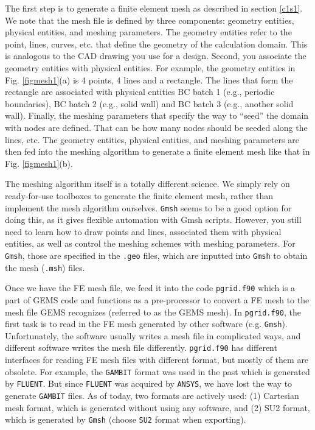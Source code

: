 \documentclass[12pt, letterpaper]{report}
\begin{document}
The first step is to generate a finite element mesh as described in section \ref{c1s1}. We note that
the mesh file is defined by three components: geometry entities, physical entities, and meshing
parameters. The geometry entities refer to the point, lines, curves, etc. that define the geometry
of the calculation domain. This is analogous to the CAD drawing you use for a design. Second, you
associate the geometry entities with physical entities. For example, the geometry entities in Fig.
\ref{figmesh1}(a) is 4 points, 4 lines and a rectangle. The lines that form the rectangle are
associated with physical entities BC batch 1 (e.g., periodic boundaries), BC batch 2 (e.g., solid
wall) and BC batch 3 (e.g., another solid wall). Finally, the meshing parameters that specify the
way to ``seed'' the domain with nodes are defined. That can be how many nodes should be seeded along
the lines, etc. The geometry entities, physical entities, and meshing parameters are then fed into
the meshing algorithm to generate a finite element mesh like that in Fig. \ref{figmesh1}(b).
\paraspace

The meshing algorithm itself is a totally different science. We simply rely on ready-for-use
toolboxes to generate the finite element mesh, rather than implement the mesh algorithm ourselves.
\verb+Gmsh+ seems to be a good option for doing this, as it gives flexible automation with Gmsh
scripts. However, you still need to learn how to draw points and lines, associated them with physical
entities, as well as control the meshing schemes with meshing parameters. For \verb+Gmsh+, those are
specified in the \verb+.geo+ files, which are inputted into \verb+Gmsh+ to obtain the mesh
(\verb+.msh+) files.
\paraspace

Once we have the FE mesh file, we feed it into the code \verb+pgrid.f90+ which is a part of GEMS
code and functions as a pre-processor to convert a FE mesh to the mesh file GEMS recognizes
(referred to as the GEMS mesh). In \verb+pgrid.f90+, the first task is to read in the FE mesh
generated by other software (e.g. \verb+Gmsh+). Unfortunately, the software usually writes a mesh
file in complicated ways, and different software writes the mesh file differently. \verb+pgrid.f90+
has different interfaces for reading FE mesh files with different format, but mostly of them are
obsolete. For example, the \verb+GAMBIT+ format was used in the past which is generated by
\verb+FLUENT+. But since \verb+FLUENT+ was acquired by \verb+ANSYS+, we have lost the way to
generate \verb+GAMBIT+ files.  As of today, two formats are actively used: (1) Cartesian mesh
format, which is generated without using any software, and (2) SU2 format, which is generated by
\verb+Gmsh+ (choose \verb+SU2+ format when exporting).  \paraspace
\end{document}

